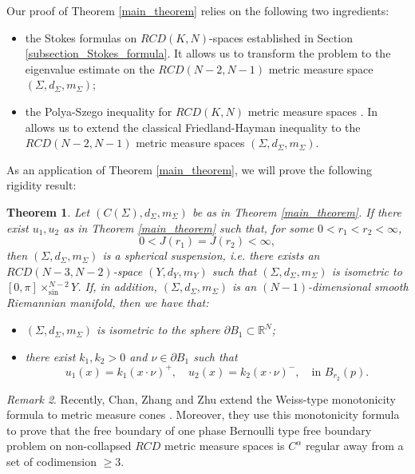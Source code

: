 \documentclass{article}
\newtheorem{theorem}{Theorem}[section]
\theoremstyle{remark}
\newtheorem{remark}[theorem]{Remark}
\numberwithin{equation}{section}
\theoremstyle{definition}
\begin{document}
    Our proof of Theorem \ref{main_theorem} relies on the following two ingredients:
    \begin{itemize}
    	\item the Stokes formulas on $RCD(K,N)$-spaces established in Section \ref{subsection_Stokes_formula}. It allows us to transform the problem to the eigenvalue estimate on the $RCD(N-2,N-1)$ metric measure space $(\Sigma,d_{\Sigma},m_{\Sigma})$;
    	\item the Polya-Szego inequality for $RCD(K,N)$ metric measure spaces \cite{Mondino-Semola_2020}. In allows us to extend the classical Friedland-Hayman inequality \cite{Friedland-Hayman_1976} to the $RCD(N-2,N-1)$ metric measure spaces $(\Sigma,d_{\Sigma},m_{\Sigma})$.
    \end{itemize}
    As an application of Theorem \ref{main_theorem}, we will prove the following rigidity result:
    \begin{theorem}\label{rigidity_theorem}
    	Let $(C(\Sigma),d_{\Sigma},m_{\Sigma})$ be as in Theorem \ref{main_theorem}. If there exist $u_{1},u_{2}$ as in Theorem \ref{main_theorem} such that, for some $0<r_{1}<r_{2}<\infty$,
    	\begin{equation}
    		0<J(r_{1})=J(r_{2}) < \infty,
    	\end{equation}
    	then $(\Sigma,d_{\Sigma},m_{\Sigma})$ is a spherical suspension, i.e. there exists an $RCD(N-3,N-2)$-space $(Y,d_{Y},m_{Y})$ such that $(\Sigma,d_{\Sigma},m_{\Sigma})$ is isometric to $[0,\pi] \times_{\sin}^{N-2} Y$. If, in addition, $(\Sigma,d_{\Sigma},m_{\Sigma})$ is an $(N-1)$-dimensional smooth Riemannian manifold, then we have that:
    	\begin{itemize}
    		\item[(1)] $(\Sigma,d_{\Sigma},m_{\Sigma})$ is isometric to the sphere $\partial B_{1} \subset \mathbb{R}^{N}$;
    		\item[(2)] there exist $k_{1},k_{2}>0$ and $\nu \in \partial B_{1}$ such that
    		\begin{equation}
    			u_{1}(x)=k_{1}(x \cdot \nu)^{+},\quad u_{2}(x)=k_{2}(x\cdot\nu)^{-},\quad \text{in } B_{r_{2}}(p).
    		\end{equation}
    	\end{itemize}
    \end{theorem}
    \begin{remark}
    	Recently, Chan, Zhang and Zhu extend the Weiss-type monotonicity formula to metric measure cones \cite{Chan-Zhang-Zhu_2021}. Moreover, they use this monotonicity formula to prove that the free boundary of one phase Bernoulli type free boundary problem on non-collapsed $RCD$ metric measure spaces is $C^{\alpha}$ regular away from a set of codimension $\ge 3$.
    \end{remark}
\end{document}
